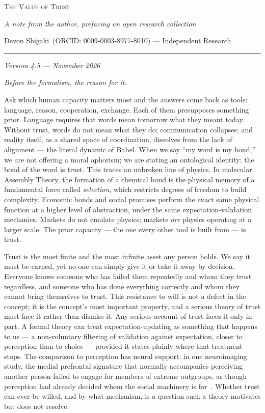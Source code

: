 \documentclass[11pt]{article}
\renewcommand{\maketitle}{%
  \begin{center}
    {\LARGE\scshape The Value of Trust\par}
    \vspace{0.9em}
    {\normalsize\itshape A note from the author, prefacing an open research collection\par}
    \vspace{1.1em}
    {\normalsize Devon Shigaki~(ORCID: 0009-0003-8977-8010) --- Independent Research\par}
    \vspace{0.8em}
    {\rule{0.32\textwidth}{0.4pt}\par}
  \end{center}
  \vspace{1.2em}
}
\begin{document}
\maketitle
\begin{center}\small\itshape Version 4.5 --- November 2026\end{center}
\thispagestyle{empty}

\noindent\emph{Before the formalism, the reason for it.}

Ask which human capacity matters most and the answers come back as tools: language, reason, cooperation, exchange. Each of them presupposes something prior. Language requires that words mean tomorrow what they meant today. Without trust, words do not mean what they do; communication collapses; and reality itself, as a shared space of coordination, dissolves from the lack of alignment --- the literal dynamic of Babel. When we say ``my word is my bond,'' we are not offering a moral aphorism; we are stating an ontological identity: the bond of the word is trust. This traces an unbroken line of physics. In molecular Assembly Theory, the formation of a chemical bond is the physical memory of a fundamental force called \emph{selection}, which restricts degrees of freedom to build complexity. Economic bonds and social promises perform the exact same physical function at a higher level of abstraction, under the same expectation-validation mechanics. Markets do not emulate physics; markets \emph{are} physics operating at a larger scale. The prior capacity --- the one every other tool is built from --- is trust.

Trust is the most finite and the most infinite asset any person holds. We say it must be earned, yet no one can simply give it or take it away by decision. Everyone knows someone who has failed them repeatedly and whom they trust regardless, and someone who has done everything correctly and whom they cannot bring themselves to trust. This resistance to will is not a defect in the concept; it is the concept's most important property, and a serious theory of trust must face it rather than dismiss it. Any serious account of trust faces it only in part. A formal theory can treat expectation-updating as something that happens to us --- a non-voluntary filtering of validation against expectation, closer to perception than to choice --- provided it states plainly where that treatment stops. The comparison to perception has neural support: in one neuroimaging study, the medial prefrontal signature that normally accompanies perceiving another person failed to engage for members of extreme outgroups, as though perception had already decided whom the social machinery is for~\cite{harris2006}. Whether trust can ever be willed, and by what mechanism, is a question such a theory motivates but does not resolve.
\end{document}
